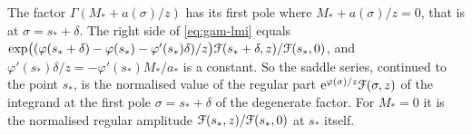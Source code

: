 \begin{rmk}
\label{rmk:gam-lmi-words}
The factor $\Gamma(M_*+a(\sigma)/z)$ has its first pole where $M_*+a(\sigma)/z=0$, that is at $\sigma=s_*+\delta$. The right side of \eqref{eq:gam-lmi} equals $\exp\bigl((\varphi(s_*+\delta)-\varphi(s_*)-\varphi'(s_*)\delta)/z\bigr)\mathcal{F}(s_*+\delta,z)/\mathcal{F}(s_*,0)$, and $\varphi'(s_*)\delta/z=-\varphi'(s_*)M_*/a_*$ is a constant. So the saddle series, continued to the point $s_*$, is the normalised value of the regular part $\mathrm{e}^{\varphi(\sigma)/z}\mathcal{F}(\sigma,z)$ of the integrand at the first pole $\sigma=s_*+\delta$ of the degenerate factor. For $M_*=0$ it is the normalised regular amplitude $\mathcal{F}(s_*,z)/\mathcal{F}(s_*,0)$ at $s_*$ itself.
\end{rmk}



